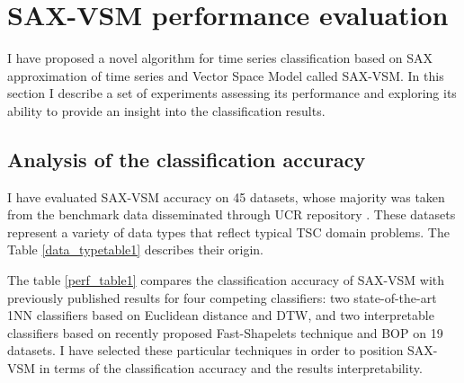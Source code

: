 \section{SAX-VSM performance evaluation} \label{results}
I have proposed a novel algorithm for time series classification based on SAX approximation of time series and 
Vector Space Model called SAX-VSM. In this section I describe a set of experiments assessing its performance and 
exploring its ability to provide an insight into the classification results.

\subsection{Analysis of the classification accuracy}
I have evaluated SAX-VSM accuracy on 45 datasets, whose majority was taken from the benchmark data disseminated 
through UCR repository \cite{ucr}. These datasets represent a variety of data types that reflect typical TSC domain problems. 
The Table \ref{data_typetable1} describes their origin.

The table \ref{perf_table1} compares the classification accuracy of \mbox{SAX-VSM} with 
previously published results for four competing classifiers: 
two state-of-the-art 1NN classifiers based on Euclidean distance and DTW, 
and two interpretable classifiers based on recently proposed Fast-Shapelets technique \cite{citeulike:12563493} 
and BOP \cite{citeulike:10525778} on 19 datasets.
I have selected these particular techniques in order to position \mbox{SAX-VSM} in terms of 
the classification accuracy and the results interpretability. 

